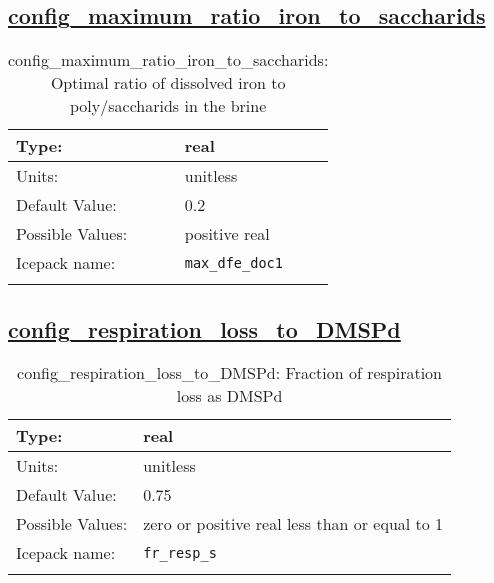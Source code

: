 \subsection[config\_maximum\_ratio\_iron\_to\_saccharids]{\hyperref[sec:nm_tab_biogeochemistry]{config\_maximum\_ratio\_iron\_to\_saccharids}}
\label{subsec:nm_sec_config_maximum_ratio_iron_to_saccharids}
\begin{center}
\begin{longtable}{| p{2.0in} || p{4.0in} |}
    \hline
    Type: & real \\
    \hline
    Units: & \si{unitless} \\
    \hline
    Default Value: & 0.2 \\
    \hline
    Possible Values: & positive real \\
    \hline
    \hline
    Icepack name: & \verb+max_dfe_doc1+ \\
    \caption{config\_maximum\_ratio\_iron\_to\_saccharids: Optimal ratio of dissolved iron to poly/saccharids in the brine}
\end{longtable}
\end{center}
\subsection[config\_respiration\_loss\_to\_DMSPd]{\hyperref[sec:nm_tab_biogeochemistry]{config\_respiration\_loss\_to\_DMSPd}}
\label{subsec:nm_sec_config_respiration_loss_to_DMSPd}
\begin{center}
\begin{longtable}{| p{2.0in} || p{4.0in} |}
    \hline
    Type: & real \\
    \hline
    Units: & \si{unitless} \\
    \hline
    Default Value: & 0.75 \\
    \hline
    Possible Values: & zero or positive real less than or equal to 1 \\
    \hline
    \hline
    Icepack name: & \verb+fr_resp_s+ \\
    \caption{config\_respiration\_loss\_to\_DMSPd: Fraction of respiration loss as DMSPd}
\end{longtable}
\end{center}
